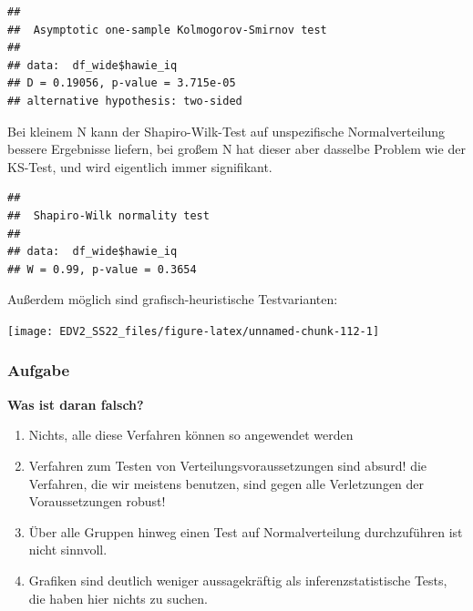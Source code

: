 \documentclass[
]{book}
\newenvironment{Shaded}{\begin{snugshade}}{\end{snugshade}}
\newcommand{\AttributeTok}[1]{\textcolor[rgb]{0.77,0.63,0.00}{#1}}
\newcommand{\DecValTok}[1]{\textcolor[rgb]{0.00,0.00,0.81}{#1}}
\newcommand{\FunctionTok}[1]{\textcolor[rgb]{0.00,0.00,0.00}{#1}}
\newcommand{\NormalTok}[1]{#1}
\newcommand{\SpecialCharTok}[1]{\textcolor[rgb]{0.00,0.00,0.00}{#1}}
\newcommand{\StringTok}[1]{\textcolor[rgb]{0.31,0.60,0.02}{#1}}
\begin{document}
\begin{Shaded}
\end{Shaded}

\begin{verbatim}
## 
##  Asymptotic one-sample Kolmogorov-Smirnov test
## 
## data:  df_wide$hawie_iq
## D = 0.19056, p-value = 3.715e-05
## alternative hypothesis: two-sided
\end{verbatim}

Bei kleinem N kann der Shapiro-Wilk-Test auf unspezifische Normalverteilung bessere Ergebnisse liefern, bei großem N hat dieser aber dasselbe Problem wie der KS-Test, und wird eigentlich immer signifikant.

\begin{Shaded}
\end{Shaded}

\begin{verbatim}
## 
##  Shapiro-Wilk normality test
## 
## data:  df_wide$hawie_iq
## W = 0.99, p-value = 0.3654
\end{verbatim}

Außerdem möglich sind grafisch-heuristische Testvarianten:

\begin{center}\texttt{[image: EDV2\_SS22\_files/figure-latex/unnamed-chunk-112-1]} \end{center}

\hypertarget{aufgabe-7}{%
\subsubsection{Aufgabe}\label{aufgabe-7}}

\textbf{Was ist daran falsch?}

\begin{enumerate}
\def\labelenumi{\arabic{enumi}.}
\item
  Nichts, alle diese Verfahren können so angewendet werden
\item
  Verfahren zum Testen von Verteilungsvoraussetzungen sind absurd! die Verfahren, die wir meistens benutzen, sind gegen alle Verletzungen der Voraussetzungen robust!
\item
  Über alle Gruppen hinweg einen Test auf Normalverteilung durchzuführen ist nicht sinnvoll.
\item
  Grafiken sind deutlich weniger aussagekräftig als inferenzstatistische Tests, die haben hier nichts zu suchen.
\end{enumerate}
\end{document}
